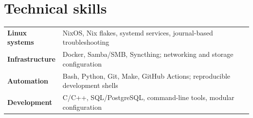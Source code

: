 \section{Technical skills}
\begingroup
\renewcommand{\arraystretch}{1.18}
\begin{tabularx}{\linewidth}{@{}>{\raggedright\arraybackslash\bfseries}p{2.8cm} X@{}}
Linux systems & NixOS, Nix flakes, systemd services, journal-based troubleshooting \\
Infrastructure & Docker, Samba/SMB, Syncthing; networking and storage configuration \\
Automation & Bash, Python, Git, Make, GitHub Actions; reproducible development shells \\
Development & C/C++, SQL/PostgreSQL, command-line tools, modular configuration \\
\end{tabularx}\par
\endgroup
